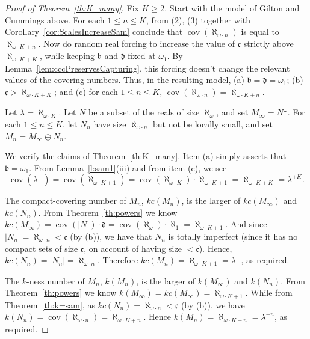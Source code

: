 \documentclass{article}
\begin{document}
\begin{proof}[Proof of  Theorem~\ref{th:K_many}]
Fix $K\ge 2$. 
Start with the model of Gilton and Cummings above. For each $1\leq n\leq K$, from (2), (3) together with Corollary~\ref{cor:ScalesIncreaseSam}   conclude that 
 $\mathop{cov}(\aleph_{\omega\cdot n})$ is equal to $\aleph_{\omega\cdot K+n}$. 
    Now do random real forcing to increase the value of $\mathfrak{c}$ strictly above $\aleph_{\omega\cdot K+K}$, while keeping $\mathfrak{b}$ and $\mathfrak{d}$ fixed at $\omega_1$. By Lemma~\ref{lem:cccPreservesCapturing}, this forcing doesn't change the relevant values of the covering numbers. 
Thus, in the resulting model, (a) $\mathfrak{b}=\mathfrak{d}=\omega_1$;
    (b) $\mathfrak{c}>\aleph_{\omega\cdot K+K}$; and
    (c) for each $1\leq n\leq K$, $\mathop{cov}(\aleph_{\omega\cdot n})=\aleph_{\omega\cdot K+n}$.

Let $\lambda=\aleph_{\omega\cdot K}$. 
Let $N$ be a subset of the reals of size $\aleph_\omega$, and set $M_\infty=N^\omega$. For each $1\le n \le K$, let $N_n$ have size $\aleph_{\omega\cdot n}$  but not be locally small, and set $M_n = M_\infty \oplus N_n$. 

We verify the claims of Theorem~\ref{th:K_many}. Item (a) simply asserts that $\mathfrak{b}=\omega_1$.
From Lemma~\ref{l:sam1}(iii) and from item (c), we see 
\[
\mathop{cov}(\lambda^+)=\mathop{cov}(\aleph_{\omega\cdot K+1})=\mathop{cov}(\aleph_{\omega\cdot K})\cdot \aleph_{\omega\cdot K+1}=\aleph_{\omega\cdot K+K}=\lambda^{+K}.
\]


The compact-covering number of $M_n$, $kc(M_n)$, is the larger of $kc(M_\infty)$ and $kc(N_n)$. 
From Theorem~\ref{th:powers} we know $kc(M_\infty)=\mathop{cov}(|N|)\cdot\mathfrak{d}=\mathop{cov}(\aleph_\omega)\cdot\aleph_1=\aleph_{\omega\cdot K+1}$. 
And since $|N_n|=\aleph_{\omega\cdot n} < \mathfrak{c}$ (by (b)), we have that $N_n$ is totally imperfect (since it has no compact sets of size $\mathfrak{c}$, on account of having size $<\mathfrak{c}$). Hence, 
$kc(N_n)=|N_n|=\aleph_{\omega\cdot n}$. 
Therefore $kc(M_n)=\aleph_{\omega\cdot K+1}=\lambda^+$, as required.

The $k$-ness number of $M_n$, $k(M_n)$, is the larger of $k(M_\infty)$ and $k(N_n)$. 
From Theorem~\ref{th:powers} we know 
$k(M_\infty)=kc(M_\infty)=\aleph_{\omega\cdot K+1}$. 
While from Theorem~\ref{th:k=sam}, as $kc(N_n)=\aleph_{\omega\cdot n}<\mathfrak{c}$ (by (b)), we have $k(N_n)=\mathop{cov}(\aleph_{\omega\cdot n})=\aleph_{\omega\cdot K+n}$. 
Hence $k(M_n)=\aleph_{\omega\cdot K+n}=\lambda^{+n}$, as required.    
\end{proof}
\end{document}
